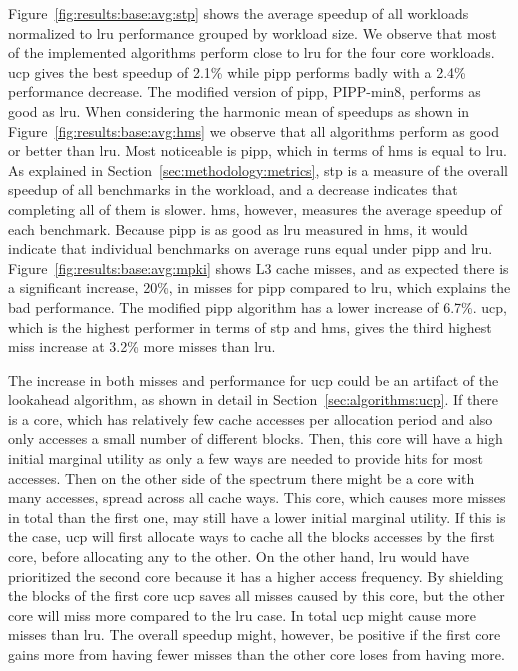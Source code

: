 Figure~\ref{fig:results:base:avg:stp} shows the average speedup of all workloads normalized to \gls{lru} performance grouped by workload size.
We observe that most of the implemented algorithms perform close to \gls{lru} for the four core workloads.
\gls{ucp} gives the best speedup of 2.1\% while \gls{pipp} performs badly with a 2.4\% performance decrease. 
The modified version of \gls{pipp}, PIPP-min8, performs as good as \gls{lru}.
When considering the harmonic mean of speedups as shown in Figure~\ref{fig:results:base:avg:hms} we observe that all algorithms perform as good or better than \gls{lru}.  
Most noticeable is \gls{pipp}, which in terms of \gls{hms} is equal to \gls{lru}.
As explained in Section~\ref{sec:methodology:metrics}, \gls{stp}  is a measure of the overall speedup of all benchmarks in the workload, and a decrease indicates that completing all of them is slower.
\gls{hms}, however, measures the average speedup of each benchmark.
Because \gls{pipp} is as good as \gls{lru} measured in \gls{hms}, it would indicate that individual benchmarks on average runs equal under \gls{pipp} and \gls{lru}.
Figure~\ref{fig:results:base:avg:mpki} shows L3 cache misses, and as expected there is a significant increase, 20\%, in misses for \gls{pipp} compared to \gls{lru}, which explains the bad performance. 
The modified \gls{pipp} algorithm has a lower increase of 6.7\%.
\gls{ucp}, which is the highest performer in terms of \gls{stp} and \gls{hms}, gives the third highest miss increase at 3.2\% more misses than \gls{lru}. 

The increase in both misses and performance for \gls{ucp} could be an artifact of the lookahead algorithm, as shown in detail in Section~\ref{sec:algorithms:ucp}.
If there is a core, which has relatively few cache accesses per allocation period and also only accesses a small number of different blocks.
Then, this core will have a high initial marginal utility as only a few ways are needed to provide hits for most accesses.
Then on the other side of the spectrum there might be a core with many accesses, spread across all cache ways.
This core, which causes more misses in total than the first one, may still have a lower initial marginal utility.
If this is the case, \gls{ucp} will first allocate ways to cache all the blocks accesses by the first core, before allocating any to the other.
On the other hand, \gls{lru} would have prioritized the second core because it has a higher access frequency.
By shielding the blocks of the first core \gls{ucp} saves all misses caused by this core, but the other core will miss more compared to the \gls{lru} case.
In total \gls{ucp} might cause more misses than \gls{lru}.
The overall speedup might, however, be positive if the first core gains more from having fewer misses than the other core loses from having more.


